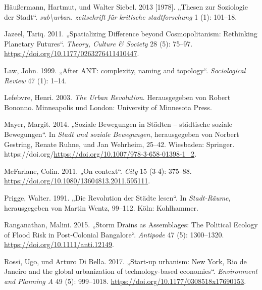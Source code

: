 \documentclass[
  ngerman,
]{article}
\newlength{\cslhangindent}
\newlength{\cslentryspacingunit} %
\newenvironment{CSLReferences}[2] %
 {%
  \setlength{\parindent}{0pt}
  \ifodd #1
  \let\oldpar\par
  \def\par{\hangindent=\cslhangindent\oldpar}
  \fi
  \setlength{\parskip}{#2\cslentryspacingunit}
 }%
 {}
\begin{document}
\begin{CSLReferences}{1}{0}
\leavevmode{}%
Häußermann, Hartmut, und Walter Siebel. 2013 {[}1978{]}. {„Thesen zur Soziologie der Stadt``}. \emph{sub\textbackslash urban. zeitschrift f{ü}r kritische stadtforschung} 1 (1): 101--18.

\leavevmode{}%
Jazeel, Tariq. 2011. {„Spatializing Difference beyond Cosmopolitanism: Rethinking Planetary Futures``}. \emph{Theory, Culture {\&} Society} 28 (5): 75--97. \url{https://doi.org/10.1177/0263276411410447}.

\leavevmode{}%
Law, John. 1999. {„After ANT: complexity, naming and topology``}. \emph{Sociological Review} 47 (1): 1--14.

\leavevmode{}%
Lefebvre, Henri. 2003. \emph{The Urban Revolution}. Herausgegeben von Robert Bononno. Minneapolis und London: University of Minnesota Press.

\leavevmode{}%
Mayer, Margit. 2014. {„Soziale Bewegungen in St{ä}dten -- st{ä}dtische soziale Bewegungen``}. In \emph{Stadt und soziale Bewegungen}, herausgegeben von Norbert Gestring, Renate Ruhne, und Jan Wehrheim, 25--42. Wiesbaden: Springer. https://doi.org/\url{https://doi.org/10.1007/978-3-658-01398-1_2}.

\leavevmode{}%
McFarlane, Colin. 2011. {„On context``}. \emph{City} 15 (3-4): 375--88. \url{https://doi.org/10.1080/13604813.2011.595111}.

\leavevmode{}%
Prigge, Walter. 1991. {„Die {Revolution} der {St{ä}dte} lesen``}. In \emph{Stadt-R{ä}ume}, herausgegeben von Martin Wentz, 99--112. K{ö}ln: Kohlhammer.

\leavevmode{}%
Ranganathan, Malini. 2015. {„Storm Drains as Assemblages: The Political Ecology of Flood Risk in Post-Colonial Bangalore``}. \emph{Antipode} 47 (5): 1300--1320. \url{https://doi.org/10.1111/anti.12149}.

\leavevmode{}%
Rossi, Ugo, und Arturo Di Bella. 2017. {„Start-up urbanism: New York, Rio de Janeiro and the global urbanization of technology-based economies``}. \emph{Environment and Planning A} 49 (5): 999--1018. \url{https://doi.org/10.1177/0308518x17690153}.


\end{CSLReferences}
\end{document}
